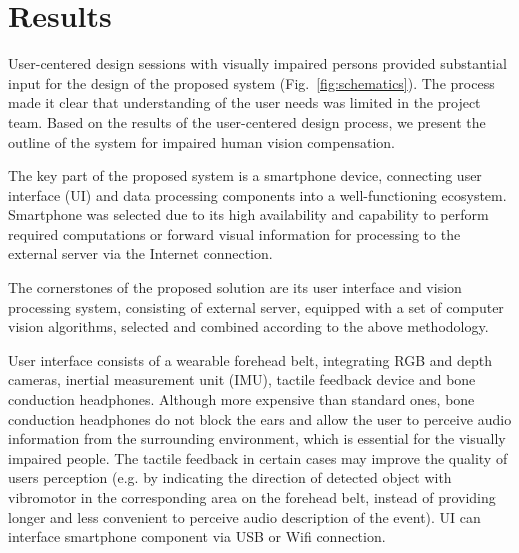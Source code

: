 \documentclass[10pt,conference,compsocconf]{IEEEtran}
\begin{document}
\section{Results}
\label{sec:results}

User-centered design sessions with visually impaired persons provided substantial input for the design of the proposed system (Fig.~\ref{fig:schematics}). The process made it clear that understanding of the user needs was limited in the project team. Based on the results of the user-centered design process, we present the outline of the system for impaired human vision compensation. 

The key part of the proposed system is a smartphone device, connecting user interface (UI) and data processing components into a well-functioning ecosystem. Smartphone was selected due to its high availability and capability to perform required computations or forward visual information for processing to the external server via the Internet connection.

The cornerstones of the proposed solution are its user interface and vision processing system, consisting of external server, equipped with a set of computer vision algorithms, selected and combined according to the above methodology.

User interface consists of a wearable forehead belt, integrating RGB and depth cameras, inertial measurement unit (IMU), tactile feedback device and bone conduction headphones. Although more expensive than standard ones, bone conduction headphones do not block the ears and allow the user to perceive audio information from the surrounding environment, which is essential for the visually impaired people. The tactile feedback in certain cases may improve the quality of users perception (e.g. by indicating the direction of detected object with vibromotor in the corresponding area on the forehead belt, instead of providing longer and less convenient to perceive audio description of the event). UI can interface smartphone component via USB or Wifi connection.
\end{document}

